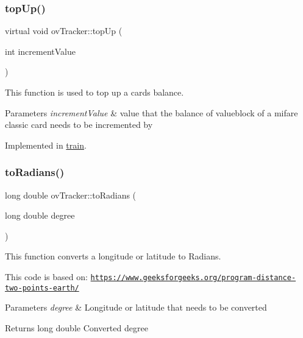 \subsubsection{\texorpdfstring{top\+Up()}{topUp()}}
{\footnotesize\ttfamily virtual void ov\+Tracker\+::top\+Up (\begin{DoxyParamCaption}\item[{int}]{increment\+Value }\end{DoxyParamCaption})\hspace{0.3cm}{\ttfamily [pure virtual]}}



This function is used to top up a cards\textquotesingle{} balance. 


\begin{DoxyParams}{Parameters}
{\em increment\+Value} & value that the balance of valueblock of a mifare classic card needs to be incremented by \\
\hline
\end{DoxyParams}


Implemented in \hyperlink{classtrain_a1bb8ac7f3f0bf3bfe61cf479abfe4cbb}{train}.

\mbox{\label{classovTracker_afabb57769940df42bc2e5b224c4db9e5}} 
\subsubsection{\texorpdfstring{to\+Radians()}{toRadians()}}
{\footnotesize\ttfamily long double ov\+Tracker\+::to\+Radians (\begin{DoxyParamCaption}\item[{long double}]{degree }\end{DoxyParamCaption})\hspace{0.3cm}{\ttfamily [protected]}}



This function converts a longitude or latitude to Radians. 

This code is based on\+: \href{https://www.geeksforgeeks.org/program-distance-two-points-earth/}{\tt https\+://www.\+geeksforgeeks.\+org/program-\/distance-\/two-\/points-\/earth/} 
\begin{DoxyParams}{Parameters}
{\em degree} & Longitude or latitude that needs to be converted \\
\hline
\end{DoxyParams}
\begin{DoxyReturn}{Returns}
long double Converted degree 
\end{DoxyReturn}
\mbox{\label{classovTracker_a793048db1b73e4e36a0cf11839048f73}} 
